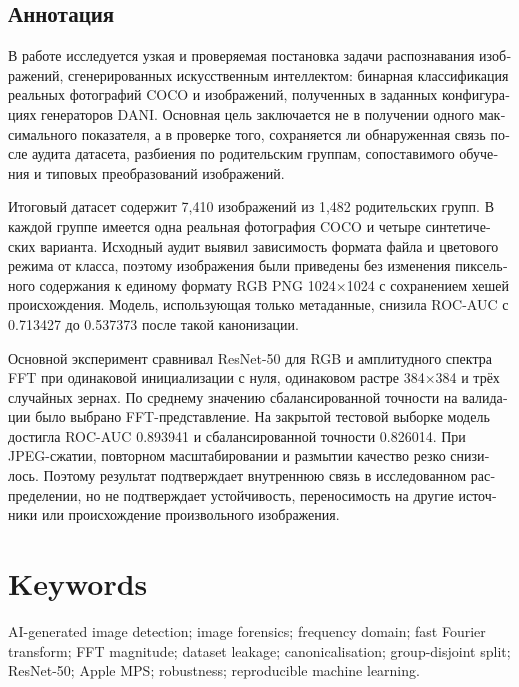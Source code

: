 \documentclass[12pt,a4paper]{article}
\begin{document}
\vspace{0.6cm}
\begin{otherlanguage}{russian}
\section*{Аннотация}

В работе исследуется узкая и проверяемая постановка задачи распознавания изображений,
сгенерированных искусственным интеллектом: бинарная классификация реальных фотографий COCO и
изображений, полученных в заданных конфигурациях генераторов DANI. Основная цель заключается не в
получении одного максимального показателя, а в проверке того, сохраняется ли обнаруженная связь
после аудита датасета, разбиения по родительским группам, сопоставимого обучения и типовых
преобразований изображений.

Итоговый датасет содержит 7,410 изображений из 1,482 родительских групп. В каждой группе имеется
одна реальная фотография COCO и четыре синтетических варианта. Исходный аудит выявил зависимость
формата файла и цветового режима от класса, поэтому изображения были приведены без изменения
пиксельного содержания к единому формату RGB PNG 1024×1024 с сохранением хешей происхождения.
Модель, использующая только метаданные, снизила ROC-AUC с 0.713427 до 0.537373 после такой
канонизации.

Основной эксперимент сравнивал ResNet-50 для RGB и амплитудного спектра FFT при одинаковой
инициализации с нуля, одинаковом растре 384×384 и трёх случайных зернах. По среднему значению
сбалансированной точности на валидации было выбрано FFT-представление. На закрытой тестовой выборке
модель достигла ROC-AUC 0.893941 и сбалансированной точности 0.826014. При JPEG-сжатии, повторном
масштабировании и размытии качество резко снизилось. Поэтому результат подтверждает внутреннюю
связь в исследованном распределении, но не подтверждает устойчивость, переносимость на другие
источники или происхождение произвольного изображения.
\end{otherlanguage}
\clearpage

\section*{Keywords}

AI-generated image detection; image forensics; frequency domain; fast Fourier transform; FFT
magnitude; dataset leakage; canonicalisation; group-disjoint split; ResNet-50; Apple MPS;
robustness; reproducible machine learning.
\end{document}

